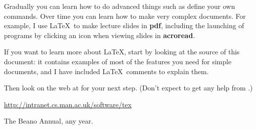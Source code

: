 \documentclass[12pt,a4paper]{article}
\begin{document}
Gradually you can learn how to do advanced things such as define your own
commands. Over time you can learn how to make very complex documents. For
example, I use \LaTeX\ to make lecture slides in \textbf{pdf}, including the
launching of programs by clicking an icon when viewing slides in
\textbf{acroread}.

If you want to learn more about \LaTeX, start by looking at the source of this
document: it contains examples of most of the features you need for simple
documents, and I have included \LaTeX\ comments to explain them.


Then look on the web at \cite{software-url} for your next step. (Don't expect
to get any help from \cite{beano}.)


\begin{thebibliography}{99}


\url{http://intranet.cs.man.ac.uk/software/tex}

The Beano Annual, any year.

\end{thebibliography}

\end{document}

